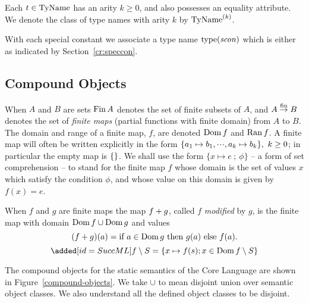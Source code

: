 Each $t\in{\rm TyName}$ has
an arity $k\geq 0$, and also possesses an equality attribute.
We denote the class of type names with arity $k$ by ${\rm TyName}^{(k)}$.

With each special constant {\scon} we associate a type
name $\mathop{\rm type}\nolimits({\it scon})$ which is either 
as indicated by Section~\ref{cr:speccon}.

\subsection{Compound Objects}
When $A$ and $B$ are sets $\mathop{\rm Fin}\nolimits A$ denotes the set of finite subsets of $A$,
and $A\stackrel{{\rm fin}}{\to}B$ denotes the set of {\sl finite maps} (partial functions
with finite domain) from $A$ to $B$.
The domain and range of a finite map, $f$, are denoted $\mathop{\rm Dom}\nolimits f$ and
$\mathop{\rm Ran}\nolimits f$.
A finite map will often be written explicitly in the form $\{a_1\mapsto b_1,\mbox{$\cdot\!\cdot\!\cdot$},a_k\mapsto b_k\},
\ k\geq 0$;
in particular the empty map is $\{\}$.
We shall use the form $\{x\mapsto e\  ;\  \phi\}$ -- a form of set
comprehension -- to stand for the finite map $f$ whose domain
is the set of values $x$ which satisfy the condition $\phi$, and
whose value on this domain is given by $f(x)=e$.

When $f$ and $g$ are finite maps the map $f + g$, called
$f$ {\sl modified} by $g$, is the finite map with domain
$\mathop{\rm Dom}\nolimits f \cup \mathop{\rm Dom}\nolimits g$ and values
\[(f + g)(a) = \mbox{if $a\in\mathop{\rm Dom}\nolimits g$ then $g(a)$ else $f(a)$.}
\]%
\[
  \ADD{\restrict{f}{S} = \{x \mapsto f(s); x\in\restrict{\Dom f}{S}\}}
\]%

The compound objects for the static semantics of the Core Language are
shown in Figure~\ref{compound-objects}.
We take $\cup$ to mean disjoint union over
semantic object classes. We also understand all the defined object
classes to be disjoint.

